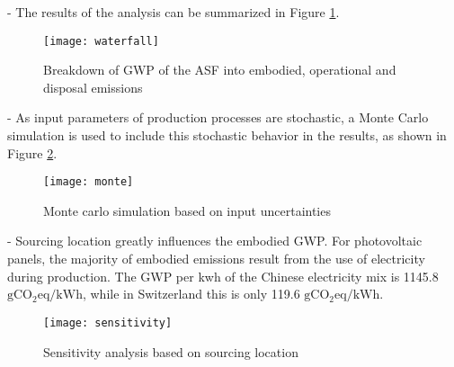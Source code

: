 
- The results of the analysis can be summarized in Figure \ref{fig:waterfall}.

\begin{figure}[H]
\begin{center}
\texttt{[image: waterfall]}
\caption{Breakdown of GWP of the ASF into embodied, operational and disposal emissions}
\label{fig:waterfall}
\end{center}
\end{figure}

- As input parameters of production processes are stochastic, a Monte Carlo simulation is used to include this stochastic behavior in the results, as shown in Figure \ref{fig:monte}.

\begin{figure}[H]
\begin{center}
\texttt{[image: monte]}
\caption{Monte carlo simulation based on input uncertainties}
\label{fig:monte}
\end{center}
\end{figure}

- Sourcing location greatly influences the embodied GWP. For photovoltaic panels, the majority of embodied emissions result from the use of electricity during production. The GWP per kwh of the Chinese electricity mix is 1145.8 ${\mathrm{gCO_2eq/kWh}}$, while in Switzerland this is only 119.6 ${\mathrm{gCO_2eq/kWh}}$.

\begin{figure}[H]
\begin{center}
\texttt{[image: sensitivity]}
\caption{Sensitivity analysis based on sourcing location}
\label{fig:sensitivity}
\end{center}
\end{figure}
